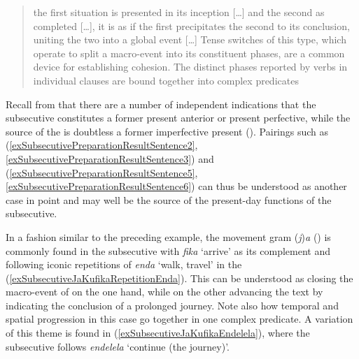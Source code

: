 \begin{quote}
the first situation is presented in its inception [\ldots] and the second as completed [\ldots], it is as if the first precipitates the second to its conclusion, uniting the two into a global event [\ldots] Tense switches of this type, which operate to split a macro-event into its constituent phases, are a common device for establishing cohesion. The distinct phases reported by verbs in individual clauses are bound together into complex predicates \citep[196f]{FleischmanS1990}
\end{quote}

Recall from   that there are a number of independent indications that the subsecutive constitutes a former present anterior or present perfective, while the source of the  is doubtless a former imperfective present (). Pairings such as (\ref{exSubsecutivePreparationResultSentence2}, \ref{exSubsecutivePreparationResultSentence3}) and (\ref{exSubsecutivePreparationResultSentence5}, \ref{exSubsecutivePreparationResultSentence6}) can thus be understood as another case in point and may well be the source of the present-day functions of the subsecutive. 

In a fashion similar to the preceding example, the movement gram (\textit{j})\textit{a} () is commonly found in the subsecutive with \textit{fika} `arrive' as its complement and following iconic repetitions of \textit{enda} `walk, travel' in the  (\ref{exSubsecutiveJaKufikaRepetitionEnda}). This can be understood as closing the macro-event of  on the one hand, while on the other advancing the text by indicating the conclusion of a prolonged journey. Note also how temporal and spatial progression in this case go together in one complex predicate. A variation of this theme is found in (\ref{exSubsecutiveJaKufikaEndelela}), where the subsecutive follows \textit{endelela} `continue (the journey)'.


